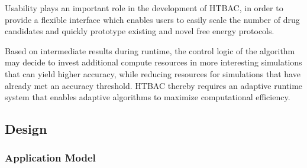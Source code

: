 


Usability plays an important role in the development of HTBAC, in order to
provide a flexible interface which enables users to easily scale the number
of drug candidates and quickly prototype existing and novel free energy
protocols.

Based on intermediate results during runtime, the control logic of the
algorithm may decide to invest additional compute resources in more
interesting simulations that can yield higher accuracy, while reducing
resources for simulations that have already met an accuracy threshold.
HTBAC thereby requires an adaptive runtime system 
 that enables adaptive algorithms to maximize computational
efficiency.

\subsection{Design}

\subsubsection{Application Model}


